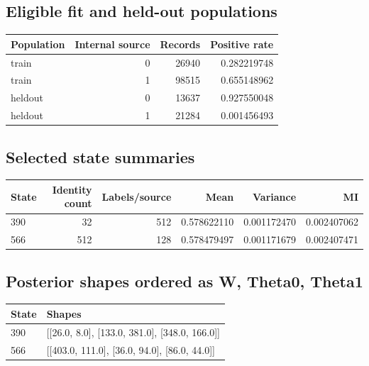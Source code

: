 \reservetable
\subsection{Eligible fit and held-out populations}

\begingroup\small
\setlength{\tabcolsep}{4pt}
\begin{longtable}{lrrr}
\toprule

Population & Internal source & Records & Positive rate\\\midrule\endhead

train & 0 & 26940 & 0.282219748\\

train & 1 & 98515 & 0.655148962\\

heldout & 0 & 13637 & 0.927550048\\

heldout & 1 & 21284 & 0.001456493\\

\bottomrule
\end{longtable}
\endgroup

\reservetable
\subsection{Selected state summaries}

\begingroup\small
\setlength{\tabcolsep}{4pt}
\begin{longtable}{lrrrrr}
\toprule

State & Identity count & Labels/source & Mean & Variance & MI\\\midrule\endhead

390 & 32 & 512 & 0.578622110 & 0.001172470 & 0.002407062\\

566 & 512 & 128 & 0.578479497 & 0.001171679 & 0.002407471\\

\bottomrule
\end{longtable}
\endgroup

\reservetable
\subsection{Posterior shapes ordered as W, Theta0, Theta1}

\begingroup\small
\setlength{\tabcolsep}{4pt}
\begin{longtable}{p{}p{}}
\toprule

State & Shapes\\\midrule\endhead

390 & [[26.0, 8.0], [133.0, 381.0], [348.0, 166.0]]\\

566 & [[403.0, 111.0], [36.0, 94.0], [86.0, 44.0]]\\

\bottomrule
\end{longtable}
\endgroup

